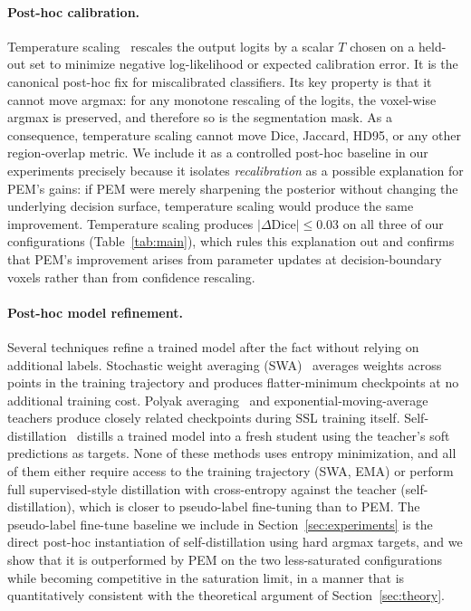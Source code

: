 \paragraph{Post-hoc calibration.}
Temperature scaling~\cite{guo2017calibration} rescales the output logits by a scalar $T$ chosen on a held-out set to minimize negative log-likelihood or expected calibration error. It is the canonical post-hoc fix for miscalibrated classifiers. Its key property is that it cannot move argmax: for any monotone rescaling of the logits, the voxel-wise argmax is preserved, and therefore so is the segmentation mask. As a consequence, temperature scaling cannot move Dice, Jaccard, HD95, or any other region-overlap metric. We include it as a controlled post-hoc baseline in our experiments precisely because it isolates \emph{recalibration} as a possible explanation for PEM's gains: if PEM were merely sharpening the posterior without changing the underlying decision surface, temperature scaling would produce the same improvement. Temperature scaling produces $|\Delta\mathrm{Dice}|\!\le\!0.03$ on all three of our configurations (Table~\ref{tab:main}), which rules this explanation out and confirms that PEM's improvement arises from parameter updates at decision-boundary voxels rather than from confidence rescaling.

\paragraph{Post-hoc model refinement.}
Several techniques refine a trained model after the fact without relying on additional labels. Stochastic weight averaging (SWA)~\cite{izmailov2018swa} averages weights across points in the training trajectory and produces flatter-minimum checkpoints at no additional training cost. Polyak averaging~\cite{polyak1992acceleration} and exponential-moving-average teachers produce closely related checkpoints during SSL training itself. Self-distillation~\cite{hinton2015distillation,allen2023self} distills a trained model into a fresh student using the teacher's soft predictions as targets. None of these methods uses entropy minimization, and all of them either require access to the training trajectory (SWA, EMA) or perform full supervised-style distillation with cross-entropy against the teacher (self-distillation), which is closer to pseudo-label fine-tuning than to PEM. The pseudo-label fine-tune baseline we include in Section~\ref{sec:experiments} is the direct post-hoc instantiation of self-distillation using hard argmax targets, and we show that it is outperformed by PEM on the two less-saturated configurations while becoming competitive in the saturation limit, in a manner that is quantitatively consistent with the theoretical argument of Section~\ref{sec:theory}.

